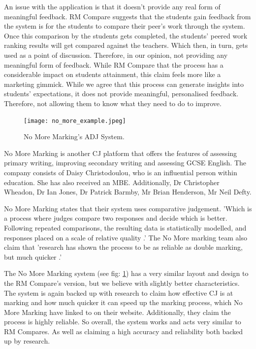 		An issue with the application is that it doesn't provide any real form of meaningful feedback. RM Compare suggests that the students gain feedback from the system is for the students to compare their peer's work through the system. Once this comparison by the students gets completed, the students' peered work ranking results will get compared against the teachers. Which then, in turn, gets used as a point of discussion. Therefore, in our opinion, not providing any meaningful form of feedback. While RM Compare that the process has a considerable impact on students attainment, this claim feels more like a marketing gimmick. While we agree that this process can generate insights into students' expectations, it does not provide meaningful, personalised feedback. Therefore, not allowing them to know what they need to do to improve. %
		
		\begin{figure}[t]
			\centering
			\texttt{[image: no\_more\_example.jpeg]}
			\caption{No More Marking's ADJ System.}
			\label{fig:no_more_ex}
			
		\end{figure}
		
		No More Marking is another CJ platform that offers the features of assessing primary writing, improving secondary writing and assessing GCSE English. The company consists of Daisy Christodoulou, who is an influential person within education. She has also received an MBE. Additionally, Dr Christopher Wheadon, Dr Ian Jones, Dr Patrick Barmby, Mr Brian Henderson, Mr Neil Defty.

		No More Marking states that their system uses comparative judgement. 'Which is a process where judges compare two responses and decide which is better. Following repeated comparisons, the resulting data is statistically modelled, and responses placed on a scale of relative quality \cite{nmm_website}.' The No More marking team also claim that 'research has shown the process to be as reliable as double marking, but much quicker \cite{nmm_website}.'	
		
		The No More Marking system (see fig: \ref{fig:no_more_ex}) has a very similar layout and design to the RM Compare's version, but we believe with slightly better characteristics. The system is again backed up with research to claim how effective CJ is at marking and how much quicker it can speed up the marking process, which No More Marking have linked to on their website. Additionally, they claim the process is highly reliable. So overall, the system works and acts very similar to RM Compares. As well as claiming a high accuracy and reliability both backed up by research.
		
